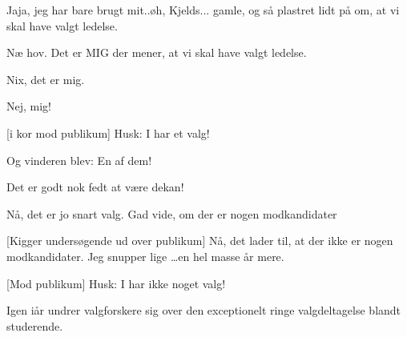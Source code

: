 \documentclass[a4paper,11pt]{article}
\begin{document}
\begin{sketch}
   Jaja, jeg har bare brugt mit..øh, Kjelds... gamle, og så
  plastret lidt på om, at vi skal have valgt ledelse.
  
   Næ hov. Det er MIG der mener, at vi skal have valgt
  ledelse.

   Nix, det er mig.

   Nej, mig!
  
  
   [i kor mod publikum] Husk: I har et valg!

   Og vinderen blev: En af dem!

  
   Det er godt nok fedt at være dekan! 

  Nå, det er jo snart valg. Gad vide, om der er nogen modkandidater

  [Kigger undersøgende ud over publikum] Nå, det lader til, at der
ikke er nogen modkandidater. Jeg snupper lige
  \ldots en hel masse år mere.
  
   [Mod publikum] Husk: I har ikke noget valg!
  
   Igen iår undrer valgforskere sig over den exceptionelt
  ringe valgdeltagelse blandt studerende.


\end{sketch}
\end{document}
